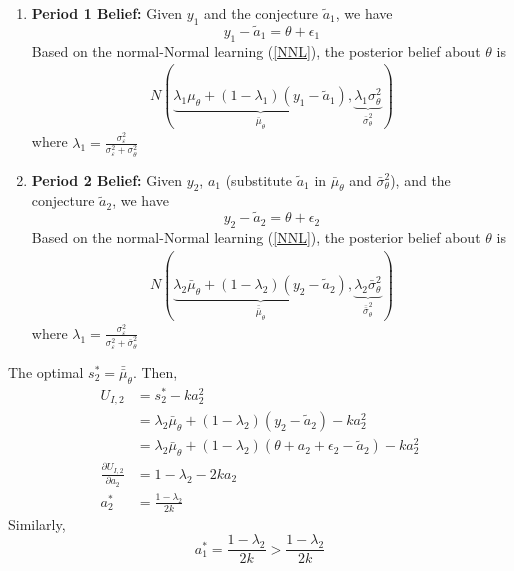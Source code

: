 \documentclass[11pt]{elegantbook}
\begin{document}
\begin{enumerate}
    \item \textbf{Period 1 Belief:}
    Given $y_1$ and the conjecture $\tilde{a}_1$, we have $$y_1-\tilde{a}_1=\theta+\epsilon_1$$
    Based on the normal-Normal learning  (\ref{NNL}), the posterior belief about $\theta$ is
    \begin{equation}
        \begin{aligned}
            N(\underbrace{\lambda_1\mu_\theta+(1-\lambda_1)(y_1-\tilde{a}_1)}_{\bar{\mu}_\theta},\underbrace{\lambda_1\sigma_\theta^2}_{\bar{\sigma}_\theta^2})
        \end{aligned}
        \nonumber
    \end{equation}
    where $\lambda_1=\frac{\sigma_\varepsilon^{2}}{\sigma_\varepsilon^{2}+\sigma_\theta^{2}}$
    \item \textbf{Period 2 Belief:} Given $y_2$, $a_1$ (substitute $\tilde{a}_1$ in $\bar{\mu}_\theta$ and $\bar{\sigma}_\theta^2$), and the conjecture $\tilde{a}_2$, we have $$y_2-\tilde{a}_2=\theta+\epsilon_2$$
    Based on the normal-Normal learning  (\ref{NNL}), the posterior belief about $\theta$ is
    \begin{equation}
        \begin{aligned}
            N(\underbrace{\lambda_2\bar{\mu}_\theta+(1-\lambda_2)(y_2-\tilde{a}_2)}_{\bar{\bar{\mu}}_\theta},\underbrace{\lambda_2\bar{\sigma}_\theta^2}_{\bar{\bar{\sigma}}_\theta^2})
        \end{aligned}
        \nonumber
    \end{equation}
    where $\lambda_1=\frac{\sigma_\varepsilon^{2}}{\sigma_\varepsilon^{2}+\bar{\sigma}_\theta^{2}}$
\end{enumerate}

The optimal $s_2^*=\bar{\bar{\mu}}_\theta$. Then,
\begin{equation}
    \begin{aligned}
        U_{I,2}&=s_2^*-k a_2^2\\
        &=\lambda_2\bar{\mu}_\theta+(1-\lambda_2)(y_2-\tilde{a}_2)-k a_2^2\\
        &=\lambda_2\bar{\mu}_\theta+(1-\lambda_2)(\theta+a_2+\epsilon_2-\tilde{a}_2)-k a_2^2\\
        \frac{\partial U_{I,2}}{\partial a_2}&=1-\lambda_2-2k a_2\\
        a_2^*&=\frac{1-\lambda_2}{2k}
    \end{aligned}
    \nonumber
\end{equation}
Similarly, $$a_1^*=\frac{1-\lambda_2}{2k}>\frac{1-\lambda_2}{2k}$$
\end{document}
